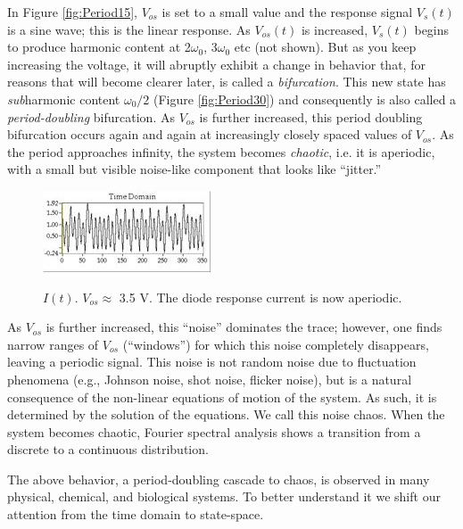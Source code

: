 \documentclass{../lab}
\begin{document}
In Figure \ref{fig:Period15}, $V_{os}$ is set to a small value and the response signal $V_s(t)$ is a sine wave; this is the linear response. As $V_{os}(t)$ is increased, $V_s(t)$ begins to produce harmonic content at 2$\omega_0$, 3$\omega_0$ etc (not shown). But as you keep increasing the voltage, it will abruptly exhibit a change in behavior that, for reasons that will become clearer later, is called a \emph{bifurcation}. This new state has \emph{sub}harmonic content $\omega_0/2$ (Figure \ref{fig:Period30}) and consequently is also called a \emph{period-doubling} bifurcation. As $V_{os}$ is further increased, this period doubling bifurcation occurs again and again at increasingly closely spaced values of $V_{os}$. As the period approaches infinity, the system becomes \emph{chaotic}, i.e. it is aperiodic, with a small but visible noise-like component that looks like ``jitter.''

\begin{figure}[h]
    \centering
    \href{http://experimentationlab.berkeley.edu/sites/default/files/images/Nldimage019.jpg}{\includegraphics[width=0.5\linewidth]{images/Nldimage019.jpg}}
    \caption{$I(t)$. $V_{os} \approx$ 3.5 V. The diode response current is now aperiodic.}
    \label{fig:Nldimage019}
\end{figure}

As $V_{os}$ is further increased, this ``noise'' dominates the trace; however, one finds narrow ranges of $V_{os}$ (``windows'') for which this noise completely disappears, leaving a periodic signal. This noise is not random noise due to fluctuation phenomena (e.g., Johnson noise, shot noise, flicker noise), but is a natural consequence of the non-linear equations of motion of the system. As such, it is determined by the solution of the equations. We call this noise chaos. When the system becomes chaotic, Fourier spectral analysis shows a transition from a discrete to a continuous distribution.

The above behavior, a period-doubling cascade to chaos, is observed in many physical, chemical, and biological systems. To better understand it we shift our attention from the time domain to state-space.
\end{document}
